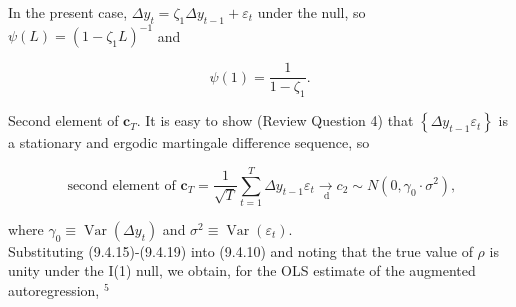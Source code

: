 \documentclass[10pt]{article}
\begin{document}
In the present case, $\Delta y_{t}=\zeta_{1} \Delta y_{t-1}+\varepsilon_{t}$ under the null, so $\psi(L)=\left(1-\zeta_{1} L\right)^{-1}$ and


\begin{equation*}
\psi(1)=\frac{1}{1-\zeta_{1}} . \tag{9.4.18}
\end{equation*}


Second element of $\mathbf{c}_{T}$. It is easy to show (Review Question 4) that $\left\{\Delta y_{t-1} \varepsilon_{t}\right\}$ is a stationary and ergodic martingale difference sequence, so


\begin{equation*}
\text { second element of } \mathbf{c}_{T}=\frac{1}{\sqrt{T}} \sum_{t=1}^{T} \Delta y_{t-1} \varepsilon_{t} \underset{\mathrm{~d}}{\rightarrow} c_{2} \sim N\left(0, \gamma_{0} \cdot \sigma^{2}\right), \tag{9.4.19}
\end{equation*}


where $\gamma_{0} \equiv \operatorname{Var}\left(\Delta y_{t}\right)$ and $\sigma^{2} \equiv \operatorname{Var}\left(\varepsilon_{t}\right)$.\\
Substituting (9.4.15)-(9.4.19) into (9.4.10) and noting that the true value of $\rho$ is unity under the I(1) null, we obtain, for the OLS estimate of the augmented autoregression, ${ }^{5}$
\end{document}
